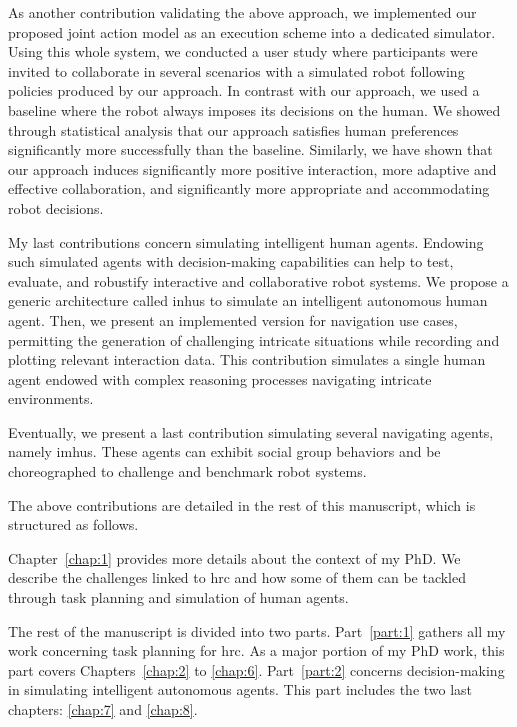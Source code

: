 As another contribution validating the above approach, we implemented our proposed joint action model as an execution scheme into a dedicated simulator. Using this whole system, we conducted a user study where participants were invited to collaborate in several scenarios with a simulated robot following policies produced by our approach. In contrast with our approach, we used a baseline where the robot always imposes its decisions on the human. We showed through statistical analysis that our approach satisfies human preferences significantly more successfully than the baseline. Similarly, we have shown that our approach induces significantly more positive interaction, more adaptive and effective collaboration, and significantly more appropriate and accommodating robot decisions.

My last contributions concern simulating intelligent human agents. Endowing such simulated agents with decision-making capabilities can help to test, evaluate, and robustify interactive and collaborative robot systems. We propose a generic architecture called \acrfull{inhus} to simulate an intelligent autonomous human agent. Then, we present an implemented version for navigation use cases, permitting the generation of challenging intricate situations while recording and plotting relevant interaction data. This contribution simulates a single human agent endowed with complex reasoning processes navigating intricate environments.

Eventually, we present a last contribution simulating several navigating agents, namely \acrfull{imhus}. These agents can exhibit social group behaviors and be choreographed to challenge and benchmark robot systems.



The above contributions are detailed in the rest of this manuscript, which is structured as follows.

Chapter~\ref{chap:1} provides more details about the context of my PhD. We describe the challenges linked to \acrshort{hrc} and how some of them can be tackled through task planning and simulation of human agents.

The rest of the manuscript is divided into two parts. Part~\ref{part:1} gathers all my work concerning task planning for \acrshort{hrc}. As a major portion of my PhD work, this part covers Chapters~\ref{chap:2} to \ref{chap:6}. Part~\ref{part:2} concerns decision-making in simulating intelligent autonomous agents. This part includes the two last chapters: \ref{chap:7} and \ref{chap:8}.

